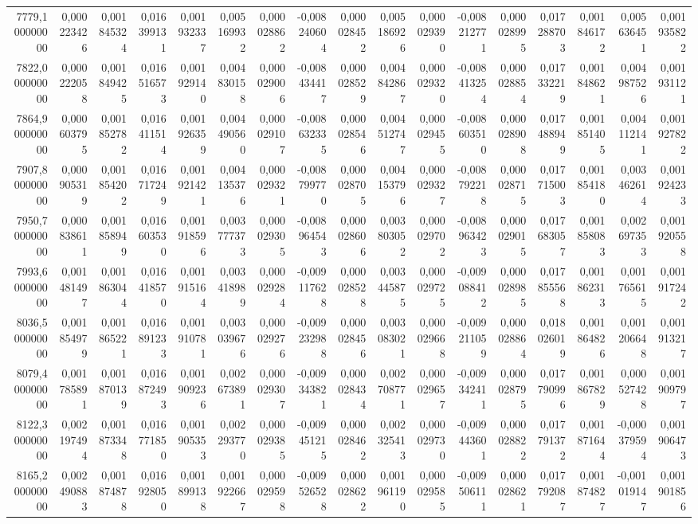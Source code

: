 \begin{longtable}{rrrrrrrrrrrrrrrrr}
7779,100000000 & 0,000223426 & 0,001845324 & 0,016399131 & 0,001932337 & 0,005169932 & 0,000028862 & -0,008240604 & 0,000028452 & 0,005186926 & 0,000029390 & -0,008212771 & 0,000028995 & 0,017288703 & 0,001846172 & 0,005636451 & 0,001935822\\
7822,000000000 & 0,000222058 & 0,001849425 & 0,016516573 & 0,001929140 & 0,004830158 & 0,000029006 & -0,008434417 & 0,000028529 & 0,004842867 & 0,000029320 & -0,008413254 & 0,000028854 & 0,017332219 & 0,001848621 & 0,004987526 & 0,001931121\\
7864,900000000 & 0,000603795 & 0,001852782 & 0,016411514 & 0,001926359 & 0,004490560 & 0,000029107 & -0,008632335 & 0,000028546 & 0,004512747 & 0,000029455 & -0,008603510 & 0,000028908 & 0,017488949 & 0,001851405 & 0,004112141 & 0,001927822\\
7907,800000000 & 0,000905319 & 0,001854202 & 0,016717249 & 0,001921421 & 0,004135376 & 0,000029321 & -0,008799770 & 0,000028705 & 0,004153796 & 0,000029327 & -0,008792218 & 0,000028715 & 0,017715003 & 0,001854180 & 0,003462614 & 0,001924233\\
7950,700000000 & 0,000838611 & 0,001858949 & 0,016603530 & 0,001918596 & 0,003777373 & 0,000029305 & -0,008964543 & 0,000028606 & 0,003803052 & 0,000029702 & -0,008963423 & 0,000029015 & 0,017683057 & 0,001858083 & 0,002697353 & 0,001920558\\
7993,600000000 & 0,001481497 & 0,001863044 & 0,016418570 & 0,001915164 & 0,003418989 & 0,000029284 & -0,009117628 & 0,000028528 & 0,003445875 & 0,000029725 & -0,009088412 & 0,000028985 & 0,017855568 & 0,001862313 & 0,001765615 & 0,001917242\\
8036,500000000 & 0,001854979 & 0,001865221 & 0,016891233 & 0,001910781 & 0,003039676 & 0,000029276 & -0,009232988 & 0,000028456 & 0,003083021 & 0,000029668 & -0,009211059 & 0,000028864 & 0,018026019 & 0,001864826 & 0,001206648 & 0,001913217\\
8079,400000000 & 0,001785891 & 0,001870139 & 0,016872493 & 0,001909236 & 0,002673891 & 0,000029307 & -0,009343821 & 0,000028434 & 0,002708771 & 0,000029657 & -0,009342411 & 0,000028795 & 0,017790996 & 0,001867829 & 0,000527428 & 0,001909797\\
8122,300000000 & 0,002197494 & 0,001873348 & 0,016771850 & 0,001905353 & 0,002293770 & 0,000029385 & -0,009451215 & 0,000028462 & 0,002325413 & 0,000029730 & -0,009443601 & 0,000028822 & 0,017791372 & 0,001871644 & -0,000379594 & 0,001906473\\
8165,200000000 & 0,002490883 & 0,001874878 & 0,016928050 & 0,001899138 & 0,001922667 & 0,000029598 & -0,009526528 & 0,000028622 & 0,001961190 & 0,000029585 & -0,009506111 & 0,000028621 & 0,017792087 & 0,001874827 & -0,001019147 & 0,001901856\\

\end{longtable}
